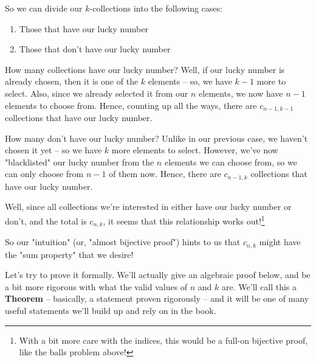 So we can divide our $k$-collections into the following cases:

\begin{enumerate}
\item Those that have our lucky number
\item Those that don't have our lucky number
\end{enumerate}

How many collections have our lucky number? Well, if our lucky number is already chosen, then it is one of the $k$ elements -- so, we have $k-1$ more to select. Also, since we already selected it from our $n$ elements, we now have $n-1$ elements to choose from. Hence, counting up all the ways, there are $c_{n-1,k-1}$ collections that have our lucky number.

How many don't have our lucky number? Unlike in our previous case, we haven't chosen it yet -- so we have $k$ more elements to select. However, we've now "blacklisted" our lucky number from the $n$ elements we can choose from, so we can only choose from $n-1$ of them now. Hence, there are $c_{n-1,k}$ collections that have our lucky number.

Well, since all collections we're interested in either have our lucky number or don't, and the total is $c_{n,k}$, it seems that this relationship works out!\footnote{With a bit more care with the indices, this would be a full-on bijective proof, like the balls problem above!}

So our "intuition" (or, "almost bijective proof") hints to us that $c_{n,k}$ might have the "sum property" that we desire!

Let's try to prove it formally. We'll actually give an algebraic proof below, and be a bit more rigorous with what the valid values of $n$ and $k$ are. We'll call this a \textbf{Theorem} -- basically, a statement proven rigorously -- and it will be one of many useful statements we'll build up and rely on in the book.



